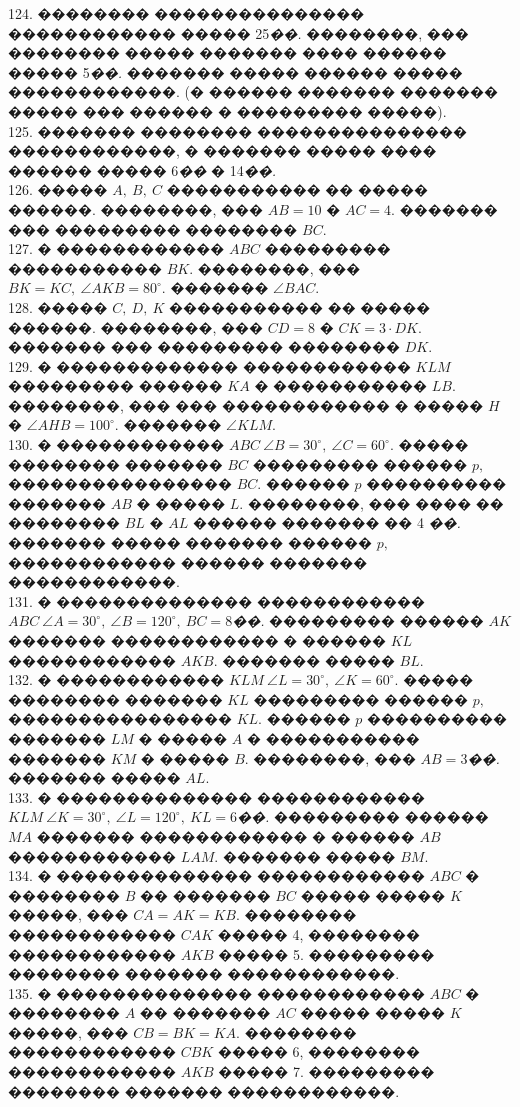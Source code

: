 \documentclass[12pt]{article}
\begin{document}
124. �������� ��������������� ������������ ����� 25{\it ��.} ��������, ��� �������� ����� ������� ���� ������ ����� 5{\it ��.} ������� ����� ������ ����� ������������. (� ������ ������� ������� ����� ��� ������ � ��������� �����).\\
125. ������� �������� ��������������� ������������, � ������� ����� ���� ������ ����� 6{\it ��} � 14{\it ��.}\\
126. ����� $A,\ B,\ C$ ����������� �� ����� ������. ��������, ��� $AB=10$ � $AC=4.$ ������� ��� ��������� �������� $BC.$\\
127. � ������������ $ABC$ ��������� ����������� $BK.$ ��������, ��� $BK=KC,\ \angle AKB=80^\circ.$ ������� $\angle BAC.$\\
128. ����� $C,\ D,\ K$ ����������� �� ����� ������. ��������, ��� $CD=8$ � $CK=3\cdot DK.$ ������� ��� ��������� �������� $DK.$\\
129. � ������������� ������������ $KLM$ ��������� ������ $KA$ � ����������� $LB.$ ��������, ��� ��� ������������ � ����� $H$ � $\angle AHB=100^\circ.$ ������� $\angle KLM.$\\
130. � ������������ $ABC\ \angle B=30^\circ,\ \angle C=60^\circ.$ ����� �������� ������� $BC$ ��������� ������ $p,$ ���������������� $BC.$ ������ $p$ ���������� ������� $AB$ � ����� $L.$ ��������, ��� ���� �� �������� $BL$ � $AL$ ������ ������� �� 4 {\it ��.} ������� ����� ������� ������ $p,$ ������������ ������ ������� ������������.\\
131. � �������������� ������������ $ABC\ \angle A=30^\circ,\ \angle B=120^\circ,\ BC=8${\it ��.} ��������� ������ $AK$ ������� ������������ � ������ $KL$ ������������ $AKB.$ ������� ����� $BL.$\\
132. � ������������ $KLM\ \angle L=30^\circ,\ \angle K=60^\circ.$ ����� �������� ������� $KL$ ��������� ������ $p,$ ���������������� $KL.$ ������ $p$ ���������� ������� $LM$ � ����� $A$ � ����������� ������� $KM$ � ����� $B.$ ��������, ��� $AB=3${\it ��.} ������� ����� $AL.$\\
133. � �������������� ������������ $KLM\ \angle K=30^\circ,\ \angle L=120^\circ,\ KL=6${\it ��.} ��������� ������ $MA$ ������� ������������ � ������ $AB$ ������������ $LAM.$ ������� ����� $BM.$\\
134. � �������������� ������������ $ABC$ � �������� $B$ �� ������� $BC$ ����� ����� $K$ �����, ��� $CA=AK=KB.$ �������� ������������ $CAK$ ����� 4, �������� ������������ $AKB$ ����� 5. ��������� �������� ������� ������������.\\
135. � �������������� ������������ $ABC$ � �������� $A$ �� ������� $AC$ ����� ����� $K$ �����, ��� $CB=BK=KA.$ �������� ������������ $CBK$ ����� 6, �������� ������������ $AKB$ ����� 7. ��������� �������� ������� ������������.\\
\end{document}
